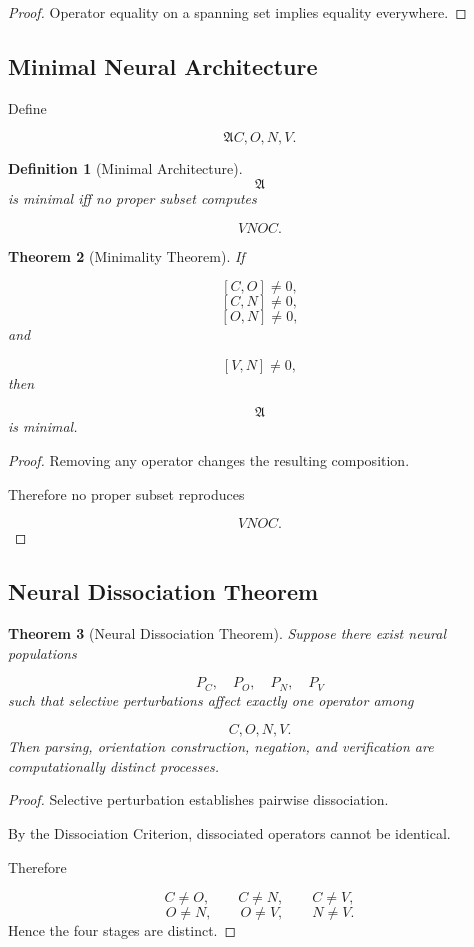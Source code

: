 \documentclass[12pt]{article}
\newtheorem{theorem}{Theorem}[section]
\newtheorem{definition}[theorem]{Definition}
\theoremstyle{remark}
\begin{document}
\begin{proof}
Operator equality on a spanning set implies equality everywhere.
\end{proof}

\subsection{Minimal Neural Architecture}

Define

\[
\mathfrak A
{C,O,N,V}.
\]

\begin{definition}[Minimal Architecture]
\[
\mathfrak A
\]
is minimal iff no proper subset computes

\[
VNOC.
\]
\end{definition}
\begin{theorem}[Minimality Theorem]
If

\[
[C,O]\neq0,
\]
\[
[C,N]\neq0,
\]
\[
[O,N]\neq0,
\]
and

\[
[V,N]\neq0,
\]
then

\[
\mathfrak A
\]
is minimal.
\end{theorem}

\begin{proof}
Removing any operator changes the resulting composition.

Therefore no proper subset reproduces

\[
VNOC.
\]
\end{proof}
\subsection{Neural Dissociation Theorem}

\begin{theorem}[Neural Dissociation Theorem]
Suppose there exist neural populations

\[
P_C,
\quad
P_O,
\quad
P_N,
\quad
P_V
\]
such that selective perturbations affect exactly one operator among

\[
C,O,N,V.
\]
Then parsing, orientation construction, negation, and verification are computationally distinct processes.
\end{theorem}

\begin{proof}
Selective perturbation establishes pairwise dissociation.

By the Dissociation Criterion, dissociated operators cannot be identical.

Therefore

\[
C\neq O,
\qquad
C\neq N,
\qquad
C\neq V,
\]
\[
O\neq N,
\qquad
O\neq V,
\qquad
N\neq V.
\]
Hence the four stages are distinct.
\end{proof}
\end{document}
